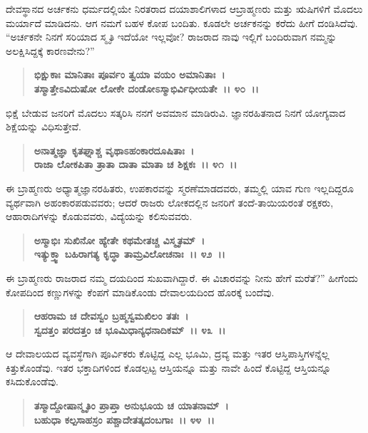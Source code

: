 ದೇವಸ್ಥಾನದ ಅರ್ಚಕನು ಧರ್ಮದಲ್ಲಿಯೇ ನಿರತರಾದ ದಯಾಶಾಲಿಗಳಾದ ಆ\break ಬ್ರಾಹ್ಮಣರು ಮತ್ತು ಋಷಿಗಳಿಗೆ ಮೊದಲು ಮರ್ಯಾದೆ ಮಾಡಿದನು. ಆಗ ನಮಗೆ ಬಹಳ ಕೋಪ ಬಂದಿತು. ಕೂಡಲೇ ಅರ್ಚಕನನ್ನು ಕರೆದು ಹೀಗೆ ದಂಡಿಸಿದೆವು. ``ಅರ್ಚಕನೇ ನಿನಗೆ ಸರಿಯಾದ ಸ್ಮೃತಿ ಇದೆಯೋ ಇಲ್ಲವೋ? ರಾಜರಾದ ನಾವು ಇಲ್ಲಿಗೆ ಬಂದಿರುವಾಗ ನಮ್ಮನ್ನು ಅಲಕ್ಷಿಸಿದ್ದಕ್ಕೆ ಕಾರಣವೇನು?”

\begin{verse}
\textbf{ಭಿಕ್ಷುಕಾಃ ಮಾನಿತಾಃ ಪೂರ್ವಂ ತ್ವಯಾ ವಯಂ ಅಮಾನಿತಾಃ~।}\\\textbf{ತಸ್ಮಾತ್ತೇಽವಿದುಷೋ ಲೋಕೇ ದಂಡೋಽಸ್ಮಾಭಿರ್ವಿಧೀಯತೇ~।। ೪೦~।। }
\end{verse}

ಭಿಕ್ಷೆ ಬೇಡುವ ಜನರಿಗೆ ಮೊದಲು ಸತ್ಕರಿಸಿ ನನಗೆ ಅವಮಾನ ಮಾಡಿರುವಿ. ಜ್ಞಾನರಹಿತನಾದ ನಿನಗೆ ಯೋಗ್ಯವಾದ ಶಿಕ್ಷೆಯನ್ನು ವಿಧಿಸುತ್ತೇವೆ.

\begin{verse}
\textbf{ಅನಾತ್ಮಜ್ಞಾ ಕೃತಘ್ನಾಶ್ಚ ವೃಥಾಽಹಂಕಾರದೂಷಿತಾಃ~।}\\\textbf{ರಾಜಾ ಲೋಕಪಿತಾ ತ್ರಾತಾ ದಾತಾ ಮಾತಾ ಚ ಶಿಕ್ಷಕಃ~।। ೪೧~।। }
\end{verse}

ಈ ಬ್ರಾಹ್ಮಣರು ಅಧ್ಯಾತ್ಮಜ್ಞಾನರಹಿತರು, ಉಪಕಾರವನ್ನು ಸ್ಮರಣೆಮಾಡದವರು, ತಮ್ಮಲ್ಲಿ ಯಾವ ಗುಣ ಇಲ್ಲದಿದ್ದರೂ ವ್ಯರ್ಥವಾಗಿ ಅಹಂಕಾರಪಡುವವರು; ಆದರೆ ರಾಜರು ಲೋಕದಲ್ಲಿನ ಜನರಿಗೆ ತಂದೆ-ತಾಯಿಯರಂತೆ ರಕ್ಷಕರು, ಆಹಾರಾದಿಗಳನ್ನು ಕೊಡುವವರು, ವಿದ್ಯೆಯನ್ನು ಕಲಿಸುವವರು.

\begin{verse}
\textbf{ಅಸ್ಮಾಭಿಃ ಸುಖಿನೋ ಹ್ಯೇತೇ ಕಥಮೇತಚ್ಚ ವಿಸ್ಮೃತಮ್~।}\\\textbf{ಇತ್ಯುಕ್ತ್ವಾ ಬಹಿರಾಗತ್ಯ ಕೃದ್ಧಾ ತಾಮ್ರವಿಲೋಚನಾಃ~।। ೪೨~।। }
\end{verse}

ಈ ಬ್ರಾಹ್ಮಣರು ರಾಜರಾದ ನಮ್ಮ ದಯದಿಂದ ಸುಖವಾಗಿದ್ದಾರೆ. ಈ ವಿಚಾರವನ್ನು ನೀನು ಹೇಗೆ ಮರೆತೆ?” ಹೀಗೆಂದು ಕೋಪದಿಂದ ಕಣ್ಣುಗಳನ್ನು ಕೆಂಪಗೆ ಮಾಡಿಕೊಂಡು ದೇವಾಲಯದಿಂದ ಹೊರಕ್ಕೆ ಬಂದೆವು.

\begin{verse}
\textbf{ಆಹರಾಮ ಚ ದೇವಸ್ವಂ ಬ್ರಹ್ಮಸ್ವಮಖಿಲಂ ತತಃ~।}\\\textbf{ಸ್ವದತ್ತಂ ಪರದತ್ತಂ ಚ ಭೂಮಿಧಾನ್ಯಧನಾದಿಕಮ್~।। ೪೩~।।} 
\end{verse}

ಆ ದೇವಾಲಯದ ವ್ಯವಸ್ಥೆಗಾಗಿ ಪೂರ್ವಿಕರು ಕೊಟ್ಟಿದ್ದ ಎಲ್ಲ ಭೂಮಿ, ದ್ರವ್ಯ ಮತ್ತು ಇತರ ಆಸ್ತಿಪಾಸ್ತಿಗಳನ್ನೆಲ್ಲ ಕಿತ್ತುಕೊಂಡೆವು. ಇತರ ಭಕ್ತಾದಿಗಳಿಂದ ಕೊಡಲ್ಪಟ್ಟ ಆಸ್ತಿಯನ್ನೂ ಮತ್ತು ನಾವೇ ಹಿಂದೆ ಕೊಟ್ಟಿದ್ದ ಆಸ್ತಿಯನ್ನೂ ಕಸಿದುಕೊಂಡೆವು.

\begin{verse}
\textbf{ತಸ್ಮಾದ್ದೋಷಾನ್ಮೃತಿಂ ಪ್ರಾಪ್ತಾ ಅನುಭೂಯ ಚ ಯಾತನಾಮ್~।}\\\textbf{ಬಹುಧಾ ಕಲ್ಪಸಾಹಸ್ರಂ ಪಶ್ಚಾದೇತತ್ಕದಂಬಗಾಃ~।। ೪೪~।। }
\end{verse}

